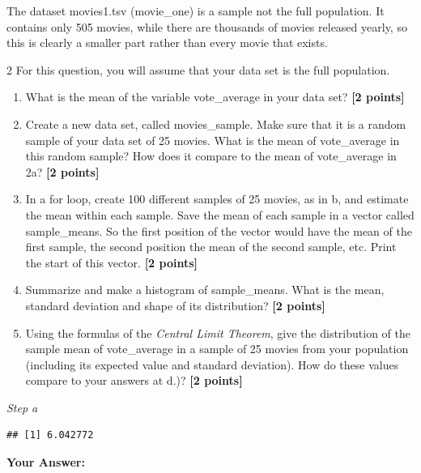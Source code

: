 \documentclass[
]{article}
\newenvironment{Shaded}{\begin{snugshade}}{\end{snugshade}}
\newcommand{\CommentTok}[1]{\textcolor[rgb]{0.56,0.35,0.01}{\textit{#1}}}
\newcommand{\FunctionTok}[1]{\textcolor[rgb]{0.13,0.29,0.53}{\textbf{#1}}}
\newcommand{\NormalTok}[1]{#1}
\newcommand{\SpecialCharTok}[1]{\textcolor[rgb]{0.81,0.36,0.00}{\textbf{#1}}}
\providecommand{\tightlist}{%
  \setlength{\itemsep}{0pt}\setlength{\parskip}{0pt}}
\begin{document}
The dataset movies1.tsv (movie\_one) is a sample not the full
population. It contains only 505 movies, while there are thousands of
movies released yearly, so this is clearly a smaller part rather than
every movie that exists.

2 For this question, you will assume that your data set is the full
population.

\begin{enumerate}
\def\labelenumi{\alph{enumi}.}
\tightlist
\item
  What is the mean of the variable vote\_average in your data set?
  \textbf{[2 points]}
\item
  Create a new data set, called movies\_sample. Make sure that it is a
  random sample of your data set of 25 movies. What is the mean of
  vote\_average in this random sample? How does it compare to the mean
  of vote\_average in 2a? \textbf{[2 points]}
\item
  In a for loop, create 100 different samples of 25 movies, as in b, and
  estimate the mean within each sample. Save the mean of each sample in
  a vector called sample\_means. So the first position of the vector
  would have the mean of the first sample, the second position the mean
  of the second sample, etc. Print the start of this vector.
  \textbf{[2 points]}
\item
  Summarize and make a histogram of sample\_means. What is the mean,
  standard deviation and shape of its distribution? \textbf{[2 points]}
\item
  Using the formulas of the \emph{Central Limit Theorem}, give the
  distribution of the sample mean of vote\_average in a sample of 25
  movies from your population (including its expected value and standard
  deviation). How do these values compare to your answers at d.)?
  \textbf{[2 points]}
\end{enumerate}

\emph{Step a}

\begin{Shaded}
\end{Shaded}

\begin{verbatim}
## [1] 6.042772
\end{verbatim}

\textbf{Your Answer:}
\end{document}
